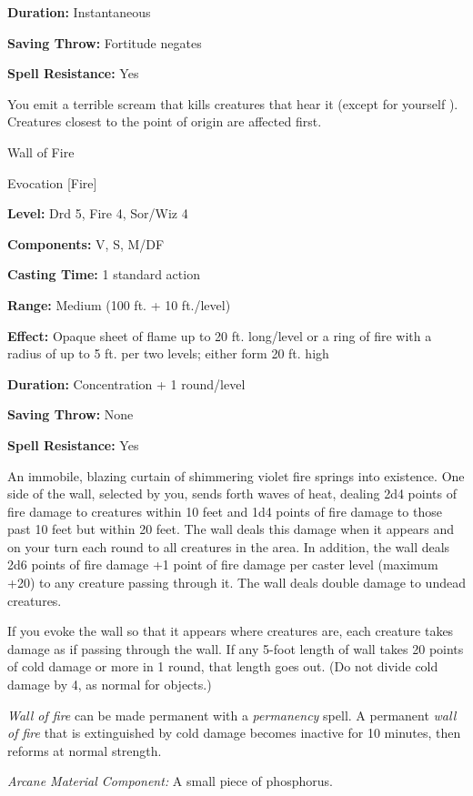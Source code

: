 \documentclass{article}
\begin{document}
\textbf{Duration:} Instantaneous

\textbf{Saving Throw:} Fortitude negates

\textbf{Spell Resistance:} Yes

You emit a terrible scream that kills creatures that hear it (except for yourself 
). Creatures closest to the point of origin are affected first.

\vspace{12pt}
Wall of Fire

Evocation [Fire]

\textbf{Level:} Drd 5, Fire 4, Sor/Wiz 4

\textbf{Components:} V, S, M/DF

\textbf{Casting Time:} 1 standard action

\textbf{Range: }Medium (100 ft. + 10 ft./level)

\textbf{Effect:} Opaque sheet of flame up to 20 ft. long/level or a ring of fire 
with a radius of up to 5 ft. per two levels; either form 20 ft. high

\textbf{Duration:} Concentration + 1 round/level

\textbf{Saving Throw:} None

\textbf{Spell Resistance:} Yes

An immobile, blazing curtain of shimmering violet fire springs into existence. 
One side of the wall, selected by you, sends forth waves of heat, dealing 2d4 points 
of fire damage to creatures within 10 feet and 1d4 points of fire damage to those 
past 10 feet but within 20 feet. The wall deals this damage when it appears and 
on your turn each round to all creatures in the area. In addition, the wall deals 
2d6 points of fire damage +1 point of fire damage per caster level (maximum +20) 
to any creature passing through it. The wall deals double damage to undead creatures.

If you evoke the wall so that it appears where creatures are, each creature takes 
damage as if passing through the wall. If any 5-foot length of wall takes 20 points 
of cold damage or more in 1 round, that length goes out. (Do not divide cold damage 
by 4, as normal for objects.)

\textit{Wall of fire }can be made permanent with a \textit{permanency }spell. A 
permanent \textit{wall of fire }that is extinguished by cold damage becomes inactive 
for 10 minutes, then reforms at normal strength.

\textit{Arcane Material Component: }A small piece of phosphorus.
\end{document}
